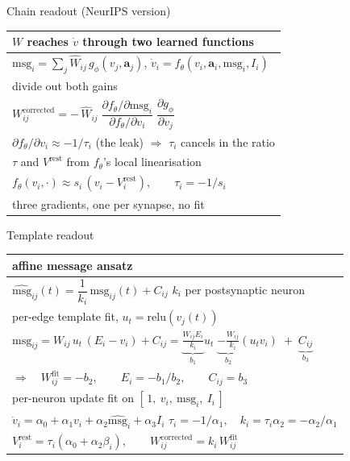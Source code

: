 \documentclass[aspectratio=169]{beamer}
\begin{document}
\begin{frame}{Chain readout \textnormal{\small(NeurIPS version)}}
\vspace*{0.4cm}
\centering\small
\begin{tabular}{@{}l@{}}
\toprule
$W$ reaches $\dot v$ through two learned functions \\
\midrule
$\mathrm{msg}_i = \sum_j \hat W_{ij}\, g_\phi(v_j, \mathbf{a}_j)$,
 \qquad $\dot v_i = f_\theta(v_i, \mathbf{a}_i, \mathrm{msg}_i, I_i)$ \\
\midrule
divide out both gains \\
\midrule
$W^{\mathrm{corrected}}_{ij}
 = -\,\hat W_{ij}\;
 \dfrac{\partial f_\theta/\partial \mathrm{msg}_i}
       {\partial f_\theta/\partial v_i}\;
 \dfrac{\partial g_\phi}{\partial v_j}$ \\[8pt]
$\partial f_\theta/\partial v_i \approx -1/\tau_i$ \quad(the leak)\quad
 $\Rightarrow$ \quad $\tau_i$ cancels in the ratio \\
\midrule
$\tau$ and $V^{\mathrm{rest}}$ from $f_\theta$'s local linearisation \\
\midrule
$f_\theta(v_i, \cdot) \approx s_i\,(v_i - V^{\mathrm{rest}}_i),
 \qquad \tau_i = -1/s_i$ \\
\midrule
three gradients, one per synapse, no fit \\
\bottomrule
\end{tabular}
\end{frame}

\begin{frame}{Template readout}
\vspace*{0.4cm}
\centering\small
\begin{tabular}{@{}l@{}}
\toprule
affine message ansatz \\
\midrule
$\widehat{\mathrm{msg}}_{ij}(t) = \dfrac{1}{k_i}\,\mathrm{msg}_{ij}(t) + C_{ij}$
 \qquad $k_i$ per postsynaptic neuron \\
\midrule
per-edge template fit, $u_t = \mathrm{relu}(v_j(t))$ \\
\midrule
$\mathrm{msg}_{ij} = W_{ij}\,u_t\,(E_i - v_i) + C_{ij}
 = \underbrace{\tfrac{W_{ij}E_i}{k_i}}_{b_1} u_t
 \;\underbrace{-\tfrac{W_{ij}}{k_i}}_{b_2} (u_t v_i)
 \;+\; \underbrace{C_{ij}}_{b_3}$ \\[6pt]
$\Rightarrow\quad W^{\mathrm{fit}}_{ij} = -b_2, \qquad E_i = -b_1/b_2, \qquad C_{ij} = b_3$ \\
\midrule
per-neuron update fit on $[\,1,\ v_i,\ \mathrm{msg}_i,\ I_i\,]$ \\
\midrule
$\dot v_i = \alpha_0 + \alpha_1 v_i + \alpha_2 \widehat{\mathrm{msg}}_i + \alpha_3 I_i$
 \qquad
$\tau_i = -1/\alpha_1, \quad k_i = \tau_i\alpha_2 = -\alpha_2/\alpha_1$ \\[6pt]
$V^{\mathrm{rest}}_i = \tau_i(\alpha_0 + \alpha_2\beta_i), \qquad
 W^{\mathrm{corrected}}_{ij} = k_i\,W^{\mathrm{fit}}_{ij}$ \\
\bottomrule
\end{tabular}
\end{frame}
\end{document}
